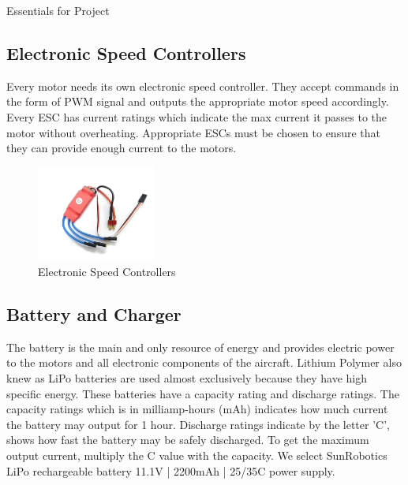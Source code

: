 \documentclass[12pt, oneside]{report}
\numberwithin{equation}{section}
\begin{document}
\begin{chapter}{Essentials for Project}
\subsection{Electronic Speed Controllers}
Every motor needs its own electronic speed controller. They accept commands in the form of PWM signal and outputs the appropriate motor speed accordingly. Every ESC has current ratings which indicate the max current it passes to the motor without overheating. Appropriate ESCs must be chosen to ensure that they can provide enough current to the motors.
\begin{figure}[h]
\center
\includegraphics[width=0.35\textwidth]{esc}
\caption{Electronic Speed Controllers}
\end{figure}

\subsection{Battery and Charger}
The battery is the main and only resource of energy and provides electric power to the motors and all electronic components of the aircraft. Lithium Polymer also knew as LiPo batteries are used almost exclusively because they have high specific energy. These batteries have a capacity rating and discharge ratings. The capacity ratings which is in milliamp-hours (mAh) indicates how much current the battery may output for 1 hour. Discharge ratings indicate by the letter 'C', shows how fast the battery may be safely discharged. To get the maximum output current, multiply the C value with the capacity. We select SunRobotics LiPo rechargeable battery 11.1V | 2200mAh | 25/35C power supply. 


\end{chapter}
\end{document}
